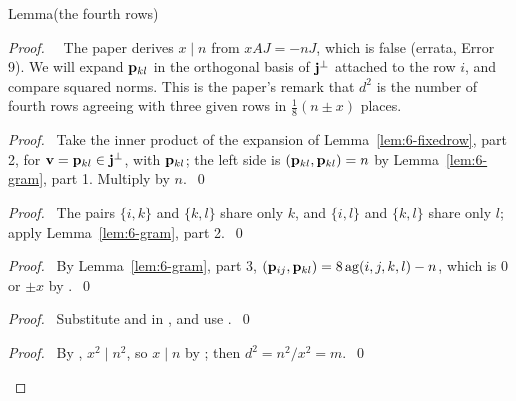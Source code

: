 \begin{namedresult}{Lemma}{(the fourth rows)}\label{lem:6-fourth}
\end{namedresult}
\begin{proof}
 \pfsketch\ \repair\ The paper derives $x\mid n$ from $xAJ=-nJ$, which is false (errata,
 Error 9). We will expand ${\mathbf p}_{kl}$ in the orthogonal basis of ${\mathbf j}^\perp$ attached to the row $i$,
 and compare squared norms. This is the paper's remark that $d^2$ is the number of fourth rows
 agreeing with three given rows in $\frac18(n\pm x)$ places.
 \begin{proof}\pf\ Take the inner product of the expansion of Lemma~\ref{lem:6-fixedrow}, part 2,
  for ${\mathbf v}={\mathbf p}_{kl}\in{\mathbf j}^\perp$, with ${\mathbf p}_{kl}$; the left side is $({\mathbf p}_{kl},{\mathbf p}_{kl})=n$ by
  Lemma~\ref{lem:6-gram}, part 1. Multiply by $n$.~\qed\end{proof}
 \begin{proof}\pf\ The pairs $\{i,k\}$ and $\{k,l\}$ share only $k$, and $\{i,l\}$ and
  $\{k,l\}$ share only $l$; apply Lemma~\ref{lem:6-gram}, part 2.~\qed\end{proof}
 \begin{proof}\pf\ By Lemma~\ref{lem:6-gram}, part 3, $({\mathbf p}_{ij},{\mathbf p}_{kl})=8\mathop{\mathrm{ag}}\nolimits(i,j,k,l)-n$,
  which is $0$ or $\pm x$ by .~\qed\end{proof}
 \begin{proof}\pf\ Substitute  and  in ,
  and use .~\qed\end{proof}
 \qedstep
 \begin{proof}\pf\ By , $x^2\mid n^2$, so $x\mid n$ by
  ; then $d^2=n^2/x^2=m$.~\qed\end{proof}
\end{proof}

